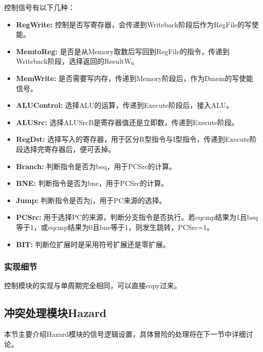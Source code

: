 \documentclass[12pt]{article} %
\begin{document}
\begin{sloppypar}
控制信号有以下几种：
\begin{itemize}
\item {\bf RegWrite:} 控制是否写寄存器，会传递到Writeback阶段后作为RegFile的写使能。 
\item {\bf MemtoReg:} 是否是从Memory取数后写回到RegFile的指令，传递到Writeback阶段，选择返回的ResultW。
\item {\bf MemWrite:} 是否需要写内存，传递到Memory阶段后，作为Dmem的写使能信号。
\item {\bf ALUControl:} 选择ALU的运算，传递到Execute阶段后，接入ALU。
\item {\bf ALUSrc:} 选择ALUSrcB是寄存器值还是立即数，传递到Execute阶段。
\item {\bf RegDst:} 选择写入的寄存器，用于区分R型指令与I型指令，传递到Execute阶段选择完寄存器后，便可丢掉。
\item {\bf Branch:} 判断指令是否为beq，用于PCSrc的计算。
\item {\bf BNE:} 判断指令是否为bne，用于PCSrc的计算。
\item {\bf Jump:} 判断指令是否为j，用于PC来源的选择。
\item {\bf PCSrc:} 用于选择PC的来源，判断分支指令是否执行。若eqcmp结果为1且beq等于1，或eqcmp结果为0且bne等于1，则发生跳转，PCSrc=1。
\item {\bf BIT:} 判断位扩展时是采用符号扩展还是零扩展。
\end{itemize}

\subsubsection{实现细节}

控制模块的实现与单周期完全相同，可以直接copy过来。


\subsection{冲突处理模块Hazard}

本节主要介绍Hazard模块的信号逻辑设置，具体冒险的处理将在下一节中详细讨论。


\end{sloppypar}
\end{document}
